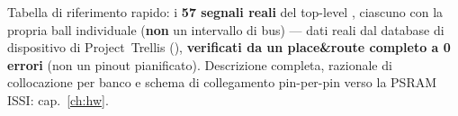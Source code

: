 \thispagestyle{plain}
\noindent
{}

\vspace{6pt}
\noindent
{\footnotesize
Tabella di riferimento rapido: i \textbf{57 segnali reali} del top-level
, ciascuno con la propria ball 
individuale (\textbf{non} un intervallo di bus) --- dati reali dal database
di dispositivo di Project~Trellis (), \textbf{verificati da
un place\&route  completo a 0 errori} (non un pinout
pianificato). Descrizione completa, razionale di collocazione per banco e
schema di collegamento pin-per-pin verso la PSRAM ISSI: cap.~\ref{ch:hw}.
}

